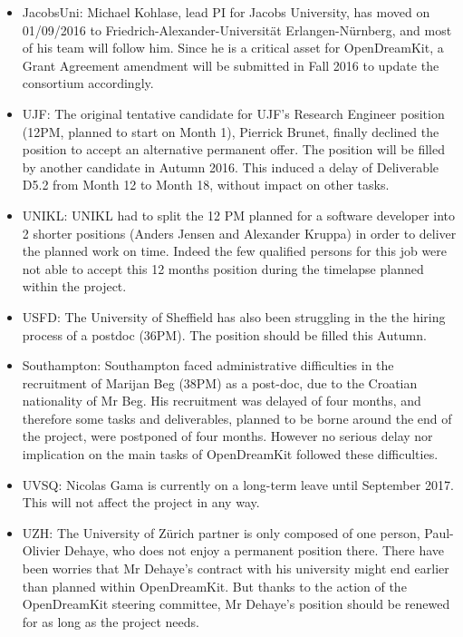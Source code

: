 \documentclass{deliverablereport}
\begin{document}
\begin{itemize}
\item{JacobsUni:} Michael Kohlase, lead PI for Jacobs University, has
  moved on 01/09/2016 to Friedrich-Alexander-Universität
  Erlangen-Nürnberg, and most of his team will follow him. Since he is
  a critical asset for OpenDreamKit, a Grant Agreement amendment will
  be submitted in Fall 2016 to update the consortium accordingly.\\

\item{UJF:} The original tentative candidate for UJF's Research
  Engineer position (12PM, planned to start on Month 1), Pierrick
  Brunet, finally declined the position to accept an alternative
  permanent offer. The position will be filled by another candidate in
  Autumn 2016. This induced a delay of Deliverable D5.2 from Month 12
  to Month 18, without impact on other tasks.\\

\item{UNIKL:} UNIKL had to split the 12 PM planned for a software developer into 2 shorter positions (Anders Jensen and Alexander Kruppa) in order to deliver the planned work on time. Indeed the few qualified persons for this job were not able to accept this 12 months position during the timelapse planned within the project.\\

\item{USFD:} The University of Sheffield has also been struggling in the the hiring process of a postdoc (36PM). The position should be filled this Autumn.\\

\item{Southampton:} Southampton faced administrative difficulties in the recruitment of Marijan Beg (38PM) as a post-doc, due to the Croatian nationality of Mr Beg. His recruitment was delayed of four months, and therefore some tasks and deliverables, planned to be borne around the end of the project, were postponed of four months. However no serious delay nor implication on the main tasks of OpenDreamKit followed these difficulties.\\

\item{UVSQ:} Nicolas Gama is currently on a long-term leave until September 2017. This will not affect the project in any way.\\

\item{UZH:} The University of Zürich partner is only composed of one person, Paul-Olivier Dehaye, who does not enjoy a permanent position there. There have been worries that Mr Dehaye's contract with his university might end earlier than planned within OpenDreamKit. But thanks to the action of the OpenDreamKit steering committee, Mr Dehaye's position should be renewed for as long as the project needs.\\


\end{itemize}
\end{document}
